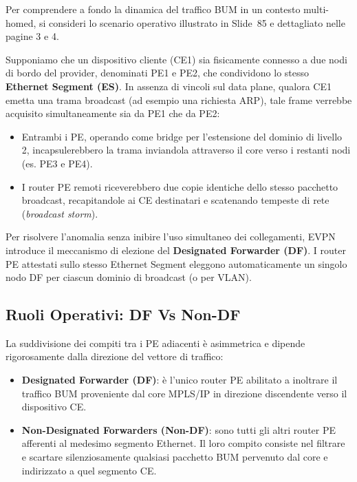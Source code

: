 \documentclass[11pt, a4paper]{article}
\begin{document}
Per comprendere a fondo la dinamica del traffico BUM in un contesto multi-homed, si consideri lo scenario operativo illustrato in Slide~85 e dettagliato nelle pagine 3 e 4.


Supponiamo che un dispositivo cliente (CE1) sia fisicamente connesso a due nodi di bordo del provider, denominati PE1 e PE2, che condividono lo stesso \textbf{Ethernet Segment (ES)}. In assenza di vincoli sul data plane, qualora CE1 emetta una trama broadcast (ad esempio una richiesta ARP), tale frame verrebbe acquisito simultaneamente sia da PE1 che da PE2:
\begin{itemize}[noitemsep]
    \item Entrambi i PE, operando come bridge per l'estensione del dominio di livello 2, incapsulerebbero la trama inviandola attraverso il core verso i restanti nodi (es. PE3 e PE4).
    \item I router PE remoti riceverebbero due copie identiche dello stesso pacchetto broadcast, recapitandole ai CE destinatari e scatenando tempeste di rete (\emph{broadcast storm}).
\end{itemize}

Per risolvere l'anomalia senza inibire l'uso simultaneo dei collegamenti, EVPN introduce il meccanismo di elezione del \textbf{Designated Forwarder (DF)}. I router PE attestati sullo stesso Ethernet Segment eleggono automaticamente un singolo nodo DF per ciascun dominio di broadcast (o per VLAN).

\subsection{Ruoli Operativi: DF Vs Non-DF}

La suddivisione dei compiti tra i PE adiacenti è asimmetrica e dipende rigorosamente dalla direzione del vettore di traffico:
\begin{itemize}
    \item \textbf{Designated Forwarder (DF)}: è l'unico router PE abilitato a inoltrare il traffico BUM proveniente dal core MPLS/IP in direzione discendente verso il dispositivo CE.
    \item \textbf{Non-Designated Forwarders (Non-DF)}: sono tutti gli altri router PE afferenti al medesimo segmento Ethernet. Il loro compito consiste nel filtrare e scartare silenziosamente qualsiasi pacchetto BUM pervenuto dal core e indirizzato a quel segmento CE.
\end{itemize}
\end{document}
